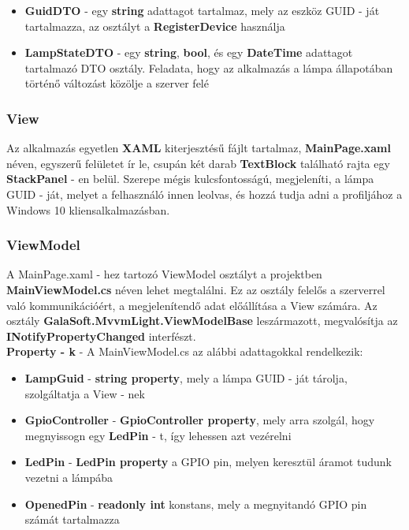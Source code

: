 \documentclass[a4paper,12pt]{report}
\begin{document}
\begin{itemize}
    \item \textbf{GuidDTO} - egy \textbf{string} adattagot tartalmaz, mely az eszköz GUID - ját tartalmazza, az osztályt
    a \textbf{RegisterDevice} használja
    \item \textbf{LampStateDTO} - egy \textbf{string}, \textbf{bool}, és egy \textbf{DateTime} adattagot tartalmazó DTO
    osztály. Feladata, hogy az alkalmazás a lámpa állapotában történő változást közölje a szerver felé
\end{itemize}

\subsubsection{View}
    Az alkalmazás egyetlen \textbf{XAML} kiterjesztésű fájlt tartalmaz, \textbf{MainPage.xaml} néven, egyszerű felületet
    ír le, csupán két darab \textbf{TextBlock} található rajta egy \textbf{StackPanel} - en belül. Szerepe mégis kulcsfontosságú,
    megjeleníti, a lámpa GUID - ját, melyet a felhasználó innen leolvas, és hozzá tudja adni a profiljához a Windows 10 kliensalkalmazásban.

\subsubsection{ViewModel}
    A MainPage.xaml - hez tartozó ViewModel osztályt a projektben \textbf{MainViewModel.cs} néven lehet megtalálni. Ez az osztály
    felelős a szerverrel való kommunikációért, a megjelenítendő adat előállítása a View számára. Az osztály \textbf{GalaSoft.MvvmLight.ViewModelBase}
    leszármazott, megvalósítja az \textbf{INotifyPropertyChanged} interfészt.\\

    \textbf{Property - k} - A MainViewModel.cs az alábbi adattagokkal rendelkezik:

\begin{itemize}
    \item \textbf{LampGuid} - \textbf{string property}, mely a lámpa GUID - ját tárolja, szolgáltatja a View - nek
    \item \textbf{GpioController} - \textbf{GpioController property}, mely arra szolgál, hogy megnyissogn egy \textbf{LedPin} - t, így
    lehessen azt vezérelni
    \item \textbf{LedPin} - \textbf{LedPin property} a GPIO pin, melyen keresztül áramot tudunk vezetni a lámpába
    \item \textbf{OpenedPin} - \textbf{readonly int} konstans, mely a megnyitandó GPIO pin számát tartalmazza
\end{itemize}
\end{document}
